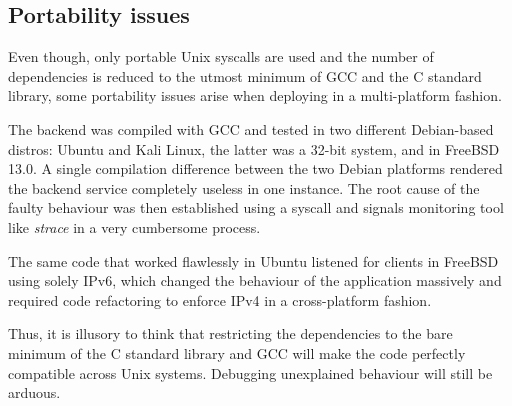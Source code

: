 \subsection{Portability issues}
Even though, only portable Unix syscalls are used and the number of dependencies is reduced to the utmost minimum of GCC and the C standard library, some portability issues arise when deploying in a multi-platform fashion.

The backend was compiled with GCC and tested in two different Debian-based distros: Ubuntu and Kali Linux, the latter was a 32-bit system, and in FreeBSD 13.0. A single compilation difference between the two Debian platforms rendered the backend service completely useless in one instance. The root cause of the faulty behaviour was then established using a syscall and signals monitoring tool like \textit{strace} in a very cumbersome process. 

The same code that worked flawlessly in Ubuntu listened for clients in FreeBSD using solely IPv6, which changed the behaviour of the application massively and required code refactoring to enforce IPv4 in a cross-platform fashion.

Thus, it is illusory to think that restricting the dependencies to the bare minimum of the C standard library and GCC will make the code perfectly compatible across Unix systems. Debugging unexplained behaviour will still be arduous.